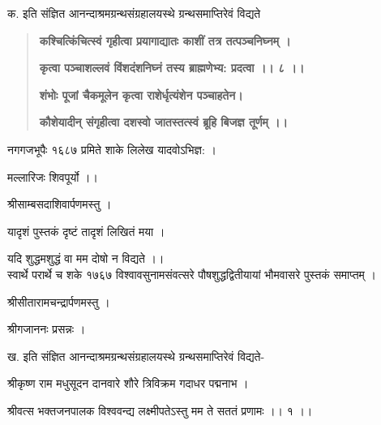 \documentclass[11pt, openany]{book}
\begin{document}
\begin{sloppypar}
\hangindent=0.2in क. इति संज्ञित आनन्दाश्रमग्रन्थसंग्रहालयस्थे ग्रन्थसमाप्तिरेवं विद्यते\textendash

\begin{quote}
\hspace{1in}\textbf{कश्चित्किंचित्स्वं गृहीत्वा प्रयागाद्यातः काशीं तत्र तत्पञ्चनिघ्नम् ।}

\hspace{1in}\textbf{कृत्वा पञ्चाशल्लवं विंशदंशनिघ्नं तस्य ब्राह्मणेभ्य: प्रदत्वा ।। ८ ।।}

\hspace{1in}\textbf{शंभोः पूजां चैकमूलेन कृत्वा राशेर्धृत्यंशेन पञ्चाहतेन।}

\hspace{1in}\textbf{कौशेयादीन् संगृहीत्वा दशस्वो जातस्तत्स्वं ब्रूहि बिजज्ञ तूर्णम् ।।}
\end{quote}

\hspace{0.2in}नगगजभूपैः १६८७ प्रमिते शाके लिलेख यादवोऽभिज्ञ: । 

\hspace{0.2in}मल्लारिजः शिवपूर्यो ।। 

\begin{center}श्रीसाम्बसदाशिवार्पणमस्तु । \end{center}

\hspace{1in}यादृशं पुस्तकं दृष्टं तादृशं लिखितं मया । 

\hspace{1in}यदि शुद्धमशुद्धं वा मम दोषो न विद्यते ।। \\

\hangindent=0.2in \hspace{0.2in}स्वार्थे परार्थे च शके १७६७ विश्वावसुनामसंवत्सरे पौषशुद्धद्वितीयायां भौमवासरे पुस्तकं समाप्तम् । 

\begin{center}
श्रीसीतारामचन्द्रार्पणमस्तु । 

श्रीगजाननः प्रसन्नः । 
\end{center}

\hangindent=0.2in \hspace{0.2in}ख. इति संज्ञित आनन्दाश्रमग्रन्थसंग्रहालयस्थे ग्रन्थसमाप्तिरेवं विद्यते- 

\hangindent=0.2in \hspace{0.2in}श्रीकृष्ण राम मधुसूदन दानवारे शौरे त्रिविक्रम गदाधर पद्मनाभ । 

\hangindent=0.2in \hspace{0.2in}श्रीवत्स भक्तजनपालक विश्ववन्द्य लक्ष्मीपतेऽस्तु मम ते सततं प्रणामः ।। १ ।। 


\end{sloppypar}
\end{document}
